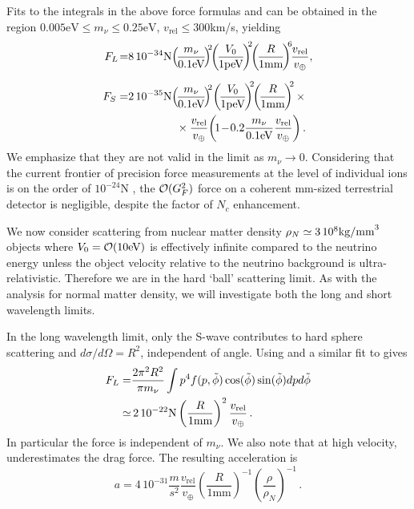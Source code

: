 Fits to the integrals in the above force formulas  and  can be obtained in the region $0.005 \text{eV}\leq m_\nu\leq 0.25\text{eV}$, $v_\text{rel}\leq 300$km/s, yielding
\begin{align}\label{F_L}
F_L\!=&8\,10^{-34}{\rm N}\!\left(\!\frac{m_\nu}{0.1 \text{eV}}\!\right)^{\!\!2}\!\! \left(\!\frac{V_0}{1\text{peV}}\!\right)^{\!\!2}\!\!\left(\!\frac{R}{1\text{mm}}\!\right)^{\!\! 6} \!\!\frac{v_{\text{rel}}}{v_\oplus},\\[0.2cm]
F_S=&2\, 10^{-35}{\rm N}\!\left(\!\frac{m_\nu}{0.1\text{eV}}\!\right)^{\!\!2}\! \left(\!\frac{V_0}{1\text{peV}}\!\right)^{\!\!2}\!\!\left(\!\frac{R}{1\text{mm}}\!\right)^{\!\!2}\times\notag \\
&\hspace*{1.5cm}\times\frac{v_{\text{rel}}}{v_\oplus}\!\left(\!1\!-\!0.2\frac{m_\nu}{0.1\text{eV}}\frac{v_{\text{rel}}}{v_\oplus}\right).
\end{align}
We emphasize that they are not valid in the limit as $m_\nu\rightarrow 0$. Considering that the current frontier of precision force measurements at the level of individual ions is on the order of $10^{-24}$N \cite{Biercuk}, the ${\cal O}(G_F^2)$ force on a coherent mm-sized terrestrial detector is negligible, despite the factor of $N_c$ enhancement. 

We now consider scattering from nuclear matter density $\rho_N\simeq 3 \, 10^{8}{\rm kg/mm}^3$ objects where $V_0={\cal O}(10\text{eV})$ is effectively infinite compared to the neutrino energy unless the object velocity relative to the neutrino background is ultra-relativistic.  Therefore we are in the hard `ball' scattering limit. As with the analysis for normal matter density, we will investigate both the long and short wavelength limits. 

In the long wavelength limit, only the S-wave contributes to hard sphere scattering and $d\sigma/d\Omega=R^2$, independent of angle. Using  and a similar fit to  gives
\begin{align}\label{FLHard}
F_L=&\frac{2\pi^2R^2}{\pi m_\nu} \int p^4 f(p,\tilde\phi) \cos(\tilde\phi) \sin(\tilde\phi) dpd\tilde\phi\notag\\
\simeq &\, 2\, 10^{-22}{\rm N}\left(\frac{R}{1\text{mm}}\right)^2\frac{v_{\text{rel}}}{v_\oplus}\,.
\end{align}
In particular the force is independent of $m_\nu$.  We also note that at high velocity,   underestimates the drag force. The resulting acceleration is
\begin{equation}
a=4\, 10^{-31}\frac{m}{s^2}\frac{v_{\text{rel}} }{v_\oplus}\! \left(\frac{R}{1\text{mm}}\right)^{-1}\!\!\left(\frac{\rho}{\rho_N}\right)^{-1}\,.\!\!
\end{equation}

